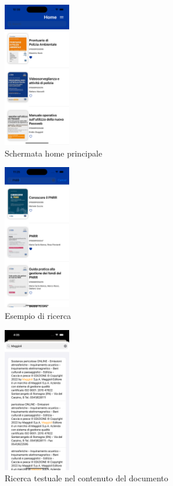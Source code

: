 \begin{multicols}{3}
    \begin{figure}[H]
        \centering
        \includegraphics[width=0.26\textwidth]{img/Simulator Screen Shot - iPhone 14 Pro - 2022-10-05 at 10.39.58.png}
        \caption{Schermata home principale}
        \label{home-ios}
    \end{figure}
    
    \begin{figure}[H]
        \centering
        \includegraphics[width=0.26\textwidth]{img/Simulator Screen Shot - iPhone 14 Pro - 2022-10-05 at 11.25.21.png}
        \caption{Esempio di ricerca}
        \label{ricerca-ios}
    \end{figure}

    \begin{figure}[H]
        \centering
        \includegraphics[width=0.26\textwidth]{img/ricerca_testo_ios.png}
        \caption{Ricerca testuale nel contenuto del documento}
        \label{ricerca_testo-ios}
    \end{figure}


\end{multicols}
